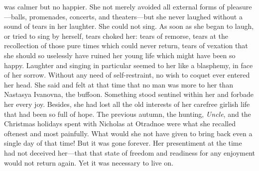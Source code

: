  was calmer but no happier. She not merely avoided all
external forms of pleasure---balls, promenades, concerts, and
theaters---but she never laughed without a sound of tears in her
laughter. She could not sing. As soon as she began to laugh, or
tried to sing by herself, tears choked her: tears of remorse,
tears at the recollection of those pure times which could never
return, tears of vexation that she should so uselessly have
ruined her young life which might have been so happy.  Laughter
and singing in particular seemed to her like a blasphemy, in face
of her sorrow. Without any need of self-restraint, no wish to
coquet ever entered her head. She said and felt at that time that
no man was more to her than Nastasya Ivanovna, the
buffoon. Something stood sentinel within her and forbade her
every joy. Besides, she had lost all the old interests of her
carefree girlish life that had been so full of hope. The previous
autumn, the hunting, \emph{Uncle}, and the Christmas holidays spent
with Nicholas at Otradnoe were what she recalled oftenest and
most painfully. What would she not have given to bring back even
a single day of that time! But it was gone forever. Her
presentiment at the time had not deceived her---that that state
of freedom and readiness for any enjoyment would not return
again. Yet it was necessary to live on.


